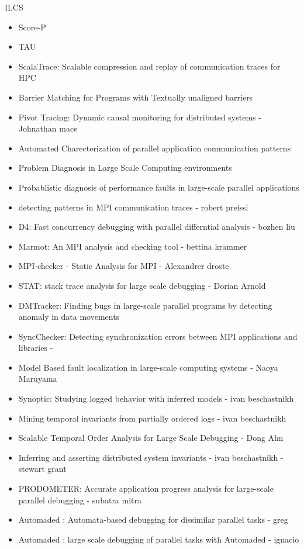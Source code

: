 ILCS \cite{ilcs}
\begin{itemize}
\item Score-P \cite{scorep}
\item TAU \cite{tau}
\item ScalaTrace: Scalable compression and replay of communication traces for HPC  \cite{scalatrace}
\item Barrier Matching for Programs with Textually unaligned barriers \cite{zhang07}
\item Pivot Tracing: Dynamic causal monitoring for distributed systems - Johnathan mace \cite{pivot}
\item Automated Charecterization of parallel application communication patterns \cite{roth-15}
\item Problem Diagnosis in Large Scale Computing environments \cite{miller06}
\item Probablistic diagnosis of performance faults in large-scale parallel applications \cite{laguna-12}
\item detecting patterns in MPI communication traces - robert preissl \cite{preissl-08}
\item D4: Fast concurrency debugging with parallel differntial analysis - bozhen liu \cite{liu-18}
\item Marmot: An MPI analysis and checking tool - bettina krammer \cite{marmot}
\item MPI-checker - Static Analysis for MPI - Alexandrer droste \cite{mpi-checker}
\item STAT: stack trace analysis for large scale debugging - Dorian Arnold \cite{stat}
\item DMTracker: Finding bugs in large-scale parallel programs by detecting anomaly in data movements \cite{dmtracker}
\item SyncChecker: Detecting synchronization errors between MPI applications and libraries - \cite{syncChecker}
\item Model Based fault localization in large-scale computing systems - Naoya Maruyama \cite{satoshi-08}
\item Synoptic: Studying logged behavior with inferred models - ivan beschastnikh \cite{beschastnikh-synoptic}
\item Mining temporal invariants from partially ordered logs -  ivan beschastnikh \cite{beschastnikh-pologs}
\item Scalable Temporal Order Analysis for Large Scale Debugging - Dong Ahn \cite{Ahn:2009}
\item Inferring and asserting distributed system invariants -  ivan beschastnikh - stewart grant \cite{grant18}
\item PRODOMETER: Accurate application progress analysis for large-scale parallel debugging - subatra mitra \cite{prodometer}
\item Automaded : Automata-based debugging for dissimilar parallel tasks - greg \cite{automaded-GBron}
\item Automaded : large scale debugging of parallel tasks with Automaded - ignacio \cite{automaded-laguna}


\end{itemize}
